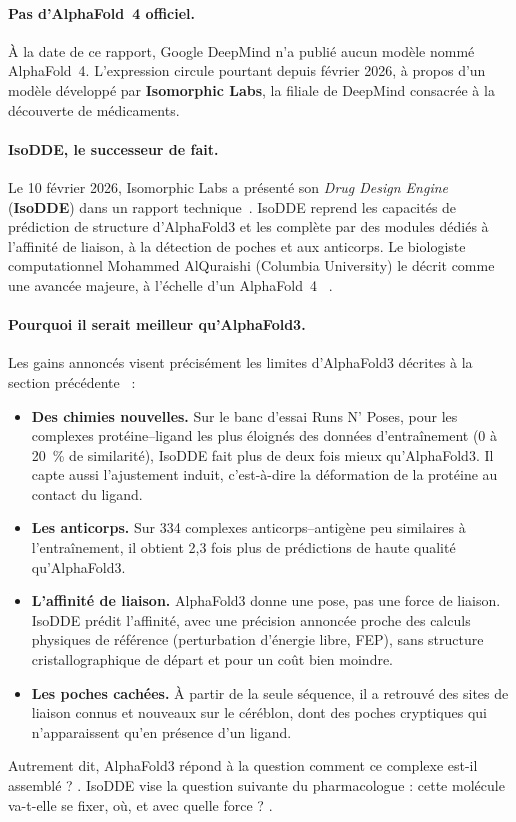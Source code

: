 \paragraph{Pas d'AlphaFold~4 officiel.} À la date de ce rapport, Google DeepMind n'a publié aucun modèle nommé AlphaFold~4. L'expression circule pourtant depuis février 2026, à propos d'un modèle développé par \textbf{Isomorphic Labs}, la filiale de DeepMind consacrée à la découverte de médicaments.

\paragraph{IsoDDE, le successeur de fait.} Le 10 février 2026, Isomorphic Labs a présenté son \emph{Drug Design Engine} (\textbf{IsoDDE}) dans un rapport technique~\cite{isodde2026}. IsoDDE reprend les capacités de prédiction de structure d'AlphaFold3 et les complète par des modules dédiés à l'affinité de liaison, à la détection de poches et aux anticorps. Le biologiste computationnel Mohammed AlQuraishi (Columbia University) le décrit comme \og une avancée majeure, à l'échelle d'un AlphaFold~4 \fg{}~\cite{callaway2026}.

\paragraph{Pourquoi il serait meilleur qu'AlphaFold3.} Les gains annoncés visent précisément les limites d'AlphaFold3 décrites à la section précédente~\cite{isodde2026,callaway2026} :
\begin{itemize}
  \item \textbf{Des chimies nouvelles.} Sur le banc d'essai Runs N' Poses, pour les complexes protéine--ligand les plus éloignés des données d'entraînement (0 à 20~\% de similarité), IsoDDE fait plus de deux fois mieux qu'AlphaFold3. Il capte aussi l'ajustement induit, c'est-à-dire la déformation de la protéine au contact du ligand.
  \item \textbf{Les anticorps.} Sur 334 complexes anticorps--antigène peu similaires à l'entraînement, il obtient 2,3 fois plus de prédictions de haute qualité qu'AlphaFold3.
  \item \textbf{L'affinité de liaison.} AlphaFold3 donne une pose, pas une force de liaison. IsoDDE prédit l'affinité, avec une précision annoncée proche des calculs physiques de référence (perturbation d'énergie libre, FEP), sans structure cristallographique de départ et pour un coût bien moindre.
  \item \textbf{Les poches cachées.} À partir de la seule séquence, il a retrouvé des sites de liaison connus et nouveaux sur le céréblon, dont des poches \og cryptiques \fg{} qui n'apparaissent qu'en présence d'un ligand.
\end{itemize}
Autrement dit, AlphaFold3 répond à la question \og comment ce complexe est-il assemblé ? \fg{}. IsoDDE vise la question suivante du pharmacologue : \og cette molécule va-t-elle se fixer, où, et avec quelle force ? \fg{}.

